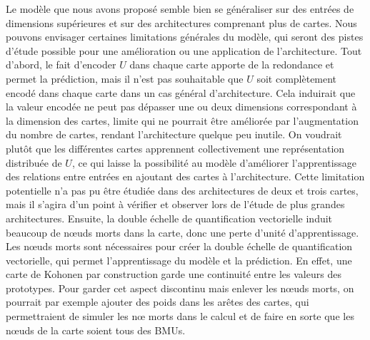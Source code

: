 Le modèle que nous avons proposé semble bien se généraliser sur des entrées de dimensions supérieures et sur des architectures comprenant plus de cartes.
Nous pouvons envisager certaines limitations générales du modèle, qui seront des pistes d'étude possible pour une amélioration ou une application de l'architecture.
Tout d'abord, le fait d'encoder $U$ dans chaque carte apporte de la redondance et permet la prédiction, mais il n'est pas souhaitable que $U$ soit complètement encodé dans chaque carte dans un cas général d'architecture.
Cela induirait que la valeur encodée ne peut pas dépasser une ou deux dimensions correspondant à la dimension des cartes, limite qui ne pourrait être améliorée par l'augmentation du nombre de cartes, rendant l'architecture quelque peu inutile. On voudrait plutôt que les différentes cartes apprennent collectivement une représentation distribuée de $U$, ce qui laisse la possibilité au modèle d'améliorer l'apprentissage des relations entre entrées en ajoutant des cartes à l'architecture. Cette limitation potentielle n'a pas pu être étudiée dans des architectures de deux et trois cartes, mais il s'agira d'un point à vérifier et observer lors de l'étude de plus grandes architectures.
Ensuite, la double échelle de quantification vectorielle induit beaucoup de n\oe{}uds morts dans la carte, donc une perte d'unité d'apprentissage. Les n\oe{}uds morts sont nécessaires pour créer la double échelle de quantification vectorielle, qui permet l'apprentissage du modèle et la prédiction. En effet, une carte de Kohonen par construction garde une continuité entre les valeurs des prototypes.
Pour garder cet aspect discontinu mais enlever les n\oe{}uds morts, on pourrait par exemple ajouter des poids dans les arêtes des cartes, qui permettraient de simuler les n\oe{} morts dans le calcul et de faire en sorte que les n\oe{}uds de la carte soient tous des BMUs.
    

